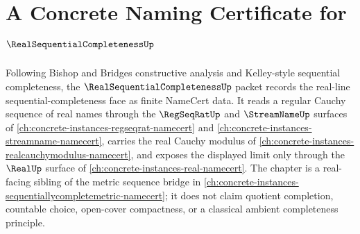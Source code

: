 \chapter{A Concrete Naming Certificate for $\RealSequentialCompletenessUp$}
\label{ch:concrete-instances-real-sequential-completeness-namecert}

Following Bishop and Bridges constructive analysis and Kelley-style sequential completeness, the $\RealSequentialCompletenessUp$ packet records the real-line sequential-completeness face as finite NameCert data. It reads a regular Cauchy sequence of real names through the $\RegSeqRatUp$ and $\StreamNameUp$ surfaces of \autoref{ch:concrete-instances-regseqrat-namecert} and \autoref{ch:concrete-instances-streamname-namecert}, carries the real Cauchy modulus of \autoref{ch:concrete-instances-realcauchymodulus-namecert}, and exposes the displayed limit only through the $\RealUp$ surface of \autoref{ch:concrete-instances-real-namecert}. The chapter is a real-facing sibling of the metric sequence bridge in \autoref{ch:concrete-instances-sequentiallycompletemetric-namecert}; it does not claim quotient completion, countable choice, open-cover compactness, or a classical ambient completeness principle.

